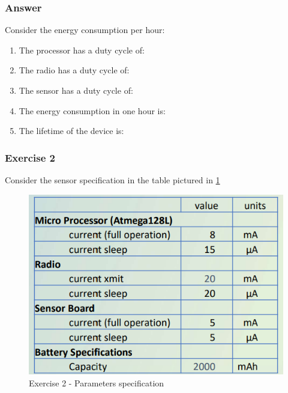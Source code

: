 \subsubsection{Answer}\label{sec:answer}
Consider the energy consumption per hour:
\begin{enumerate}
	\item The processor has a duty cycle of:
	
	\item The radio has a duty cycle of:
	\item The sensor has a duty cycle of:
	\item The energy consumption in one hour is:
	\item The lifetime of the device is: 
\end{enumerate}



\subsubsection{Exercise 2}\label{sec:exercise-2}
Consider the sensor specification in the table pictured in \ref{chenergy-ex2}
\begin{figure}
	\centering\includegraphics[scale=0.50]{images/Pasted image 20230328161140.png}
	\caption{Exercise 2 - Parameters specification}
	\label{chenergy-ex2}
\end{figure}


